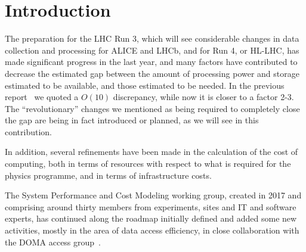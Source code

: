 \section{Introduction}
The preparation for the LHC Run 3, which will see considerable changes in
data collection and processing for ALICE and LHCb, and for Run 4, or HL-LHC,
has made significant progress in the last year, and many factors have
contributed to decrease the estimated gap between the amount of processing
power and storage estimated to be available, and those estimated to be needed.
In the previous report~\cite{costmodel} we quoted a $O(10)$ discrepancy,
while now it is closer to a factor 2-3. The ``revolutionary'' changes we
mentioned as being required to completely close the gap are being in fact
introduced or planned, as we will see in this contribution.

In addition, several refinements have been made in the calculation of
the cost of computing, both in terms of resources with respect to what is
required for the physics programme, and in terms of infrastructure costs.

The System Performance and Cost Modeling working group, created in 2017
and comprising around thirty members from experiments, sites and IT and
software experts, has continued along the roadmap initially defined and
added some new activities, mostly in the area of data access efficiency,
in close collaboration with the DOMA access group~\cite{domaaccess}.

